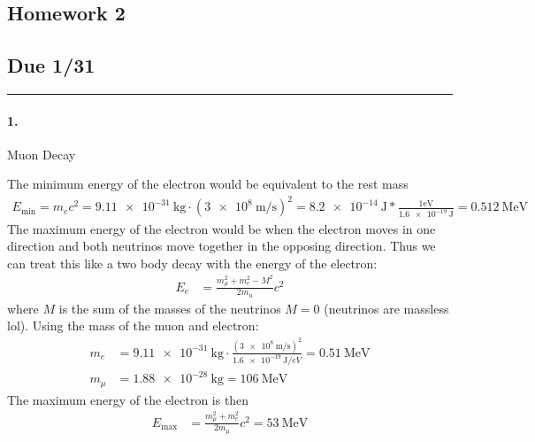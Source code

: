 \documentclass[../main.tex]{subfiles}
\begin{document}
\setcounter{section}{1}
\begin{center}
    \section*{Homework 2}
    \subsection*{Due 1/31}
\end{center}
\hrule \vspace{10px}

\paragraph{1.} Muon Decay

The minimum energy of the electron would be equivalent to the rest mass
\begin{align*}
    E_{\text{min}} = m_e c^2 = \qty{9.11e-31}{\kg} \cdot (\qty{3e8}{\m/\s})^2
    = \qty{8.2e-14}{\joule} * \frac{1 \si{\eV}}{\qty{1.6e-19}{\joule}} = 
    \boxed{\qty{0.512}{\mega\eV}}
\end{align*}
The maximum energy of the electron would be when the electron moves in one direction and both 
neutrinos move together in the opposing direction. Thus we can treat this like a two body decay
with the energy of the electron:
\begin{align*}
    E_e &= \frac{m_\mu^2 + m_e^2 - M^2}{2 m_u} c^2 
\end{align*}
where $M$ is the sum of the masses of the neutrinos $M = 0$ (neutrinos are massless lol). Using
the mass of the muon and electron:
\begin{align*}
    m_e &= \qty{9.11e-31}{\kg} \cdot \frac{(\qty{3e8}{\m/\s})^2}{\qty{1.6e-19}{\joule/eV}} 
    = \qty{0.51}{\MeV} \\
    m_\mu &= \qty{1.88e-28}{\kg} = \qty{106}{\MeV}
\end{align*}
The maximum energy of the electron is then
\begin{align*}
    E_{\text{max}} &= \frac{m_\mu^2 + m_e^2}{2 m_\mu} c^2 = \boxed{\qty{53}{\MeV}}
\end{align*}
\end{document}
